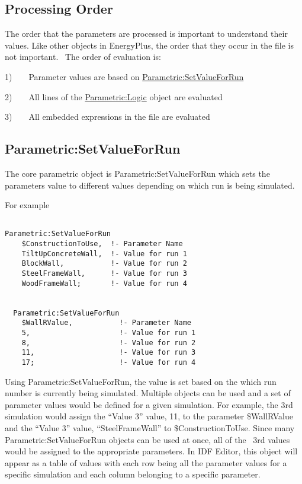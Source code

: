 \subsection{Processing Order}\label{processing-order}

The order that the parameters are processed is important to understand their values. Like other objects in EnergyPlus, the order that they occur in the file is not important.~ The order of evaluation is:

1)~~~~Parameter values are based on \hyperref[parametricsetvalueforrun]{Parametric:SetValueForRun}

2)~~~~All lines of the \hyperref[parametriclogic]{Parametric:Logic} object are evaluated

3)~~~~All embedded expressions in the file are evaluated

\subsection{Parametric:SetValueForRun}\label{parametricsetvalueforrun}

The core parametric object is Parametric:SetValueForRun which sets the parameters value to different values depending on which run is being simulated.

For example

\begin{lstlisting}

Parametric:SetValueForRun
    $ConstructionToUse,  !- Parameter Name
    TiltUpConcreteWall,  !- Value for run 1
    BlockWall,           !- Value for run 2
    SteelFrameWall,      !- Value for run 3
    WoodFrameWall;       !- Value for run 4


  Parametric:SetValueForRun
    $WallRValue,           !- Parameter Name
    5,                     !- Value for run 1
    8,                     !- Value for run 2
    11,                    !- Value for run 3
    17;                    !- Value for run 4
\end{lstlisting}

Using Parametric:SetValueForRun, the value is set based on the which run number is currently being simulated. Multiple objects can be used and a set of parameter values would be defined for a given simulation. For example, the 3rd simulation would assign the ``Value 3'' value, 11, to the parameter \$WallRValue and the ``Value 3'' value, ``SteelFrameWall'' to \$ConstructionToUse. Since many Parametric:SetValueForRun objects can be used at once, all of the~ 3rd values would be assigned to the appropriate parameters. In IDF Editor, this object will appear as a table of values with each row being all the parameter values for a specific simulation and each column belonging to a specific parameter.

